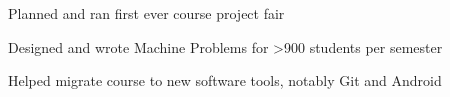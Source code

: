 \documentclass[]{deedy-resume-openfont}
\begin{document}
\begin{minipage}[t]{0.66\textwidth}

\begin{tightemize}
\item Planned and ran first ever course project fair
\item Designed and wrote Machine Problems for >900 students per semester
\item Helped migrate course to new software tools, notably Git and Android
\end{tightemize}
\sectionsep




\end{minipage}
\end{document}
